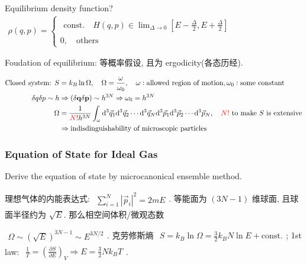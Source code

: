 \documentclass[../../main.tex]{subfiles}
\begin{document}
Equilibrium density function? 
$\begin{aligned}
    \rho(q,p) = \begin{cases}
        \begin{aligned}
            \text{const.}\quad H(q,p)\in \lim_{\Delta\rightarrow 0}\left[E - \frac{\Delta}{2},E+\frac{\Delta}{2}\right]
        \end{aligned}\\
        0,\quad \text{others}
    \end{cases}
\end{aligned}$

Foudation of equilibrium: 等概率假设, 且为 ergodicity(各态历经). 

$\begin{aligned}
    \text{Closed system: }S &= k_{B}\ln{\Omega},\quad \Omega = \frac{\omega}{\omega_{0}},\quad \omega:\text{allowed region of motion},\omega_{0}:\text{some constant}\\
    \delta q\delta p\sim h&\Rightarrow (\delta \mathbf{q}\delta \mathbf{p})\sim h^{3N}\Rightarrow \omega_{0} = h^{3N}\\
    \Omega &= \frac{1}{{\color{red}{N!}}h^{3N}}\int_{\omega}\mathrm{d}^{3}\vec{q}_{1}\mathrm{d}^{3}\vec{q}_{2}\cdots\mathrm{d}^{3}\vec{q}_{N}\mathrm{d}^{3}\vec{p}_{1}\mathrm{d}^{3}\vec{p}_{2}\cdots\mathrm{d}^{3}\vec{p}_{N},\quad{\color{red}{N!}}\text{ to make }S\text{ is extensive}\\
    &\Rightarrow\text{indisdinguishability of microscopic particles}
\end{aligned}$

\subsubsection{Equation of State for Ideal Gas}
Derive the equation of state by microcanonical ensemble method. 

理想气体的内能表达式: $\begin{aligned}
    \sum_{i=1}^{N}\left|\vec{p}_{i}\right|^{2} = 2mE
\end{aligned}$. 等能面为 $(3N-1)$ 维球面, 且球面半径约为 $\sqrt{E}$. 那么相空间体积/微观态数

$\begin{aligned}
    \Omega\sim (\sqrt{E})^{3N-1} \sim E^{3N/2}
\end{aligned}$. 克劳修斯熵 $\begin{aligned}
    S = k_{B}\ln{\Omega} = \frac{3}{2}k_{B}N\ln{E} + \text{const.}
\end{aligned}$; 1st law: $\begin{aligned}
    \frac{1}{T} = \left(\frac{\partial S}{\partial E}\right)_{V}\Rightarrow E = \frac{3}{2}Nk_{B}T
\end{aligned}$. 
\end{document}

